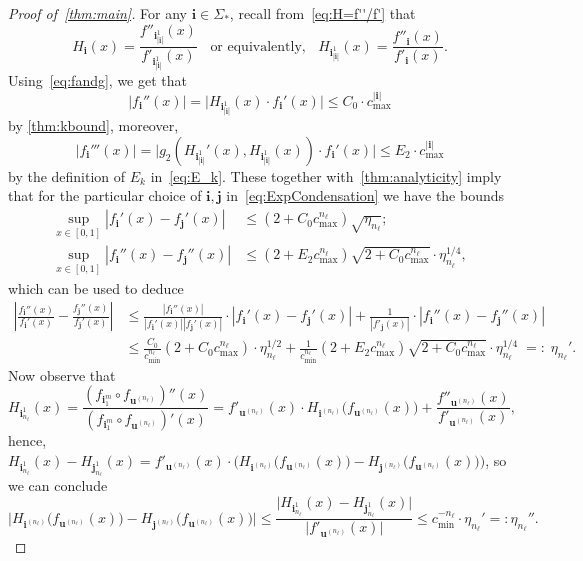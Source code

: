 \documentclass[12pt,]{article}
\theoremstyle{definition}
\theoremstyle{remark}
\newcommand{\0}{\mathbf{0}}
\newcommand{\bi}{\mathbf{i}}
\newcommand{\bj}{\mathbf{j}}
\newcommand{\bu}{\mathbf{u}}
\begin{document}
{\begin{proof}[Proof of~\cref{thm:main}]
For any $\bi\in\Sigma_*$, recall from~\cref{eq:H=f''/f'} that
\begin{equation*}
	H_{\bi}(x)= \frac{f''_{\bi_{|\bi|}^1}(x)}{f'_{\bi_{|\bi|}^1}(x)} \;\;\text{ or equivalently, }\;\; H_{\bi_{|\bi|}^1}(x) = \frac{f''_{\bi}(x)}{f'_{\bi}(x)}.
\end{equation*}
Using~\eqref{eq:fandg}, we get that
\begin{equation*}
 |f_{\bi}''(x)| = \big|H_{\bi_{|\bi|}^1}(x)\cdot f_{\bi}'(x)\big|\leq C_0 \cdot c_{\max}^{|\bi|}
\end{equation*}
by \cref{thm:kbound}, moreover,
\begin{equation*}
  |f_{\bi}'''(x)| = \big|g_2(H_{\bi_{|\bi|}^1}'(x),H_{\bi_{|\bi|}^1}(x))\cdot f_{\bi}'(x)\big| \leq E_2\cdot c_{\max}^{|\bi|}
\end{equation*}
by the definition of $E_k$ in~\cref{eq:E_k}. These together with~\cref{thm:analyticity} imply that for the particular choice of $\bi,\bj$ in~\cref{eq:ExpCondensation} we have the bounds
\begin{align*}
 \sup_{x\in[0,1]}|f_{\bi}'(x) - f_{\bj}'(x)| &\leq (2+C_0 c_{\max}^{n_\ell})\sqrt{\eta_{n_\ell}}; \\
 \sup_{x\in[0,1]}|f_{\bi}''(x) - f_{\bj}''(x)| &\leq (2+E_2c_{\max}^{n_\ell})\sqrt{2+C_0
 	c_{\max}^{n_\ell}}\cdot
 \eta_{n_\ell}^{1/4},
\end{align*}
which can be used to deduce
\begin{align*}
	\left|\frac{f_{\bi}''(x)}{f_{\bi}'(x)} - \frac{f_{\bj}''(x)}{f_{\bj}'(x)}\right|
	&\leq
	\frac{|f_{\bi}''(x)|}{|f_{\bi}'(x)||f_{\bj}'(x)|}\cdot|f_{\bi}'(x) - f_{\bj}'(x)|
	+\frac{1}{|f'_{\bj}(x)|} \cdot |f_{\bi}''(x) - f_{\bj}''(x)|
	\\
	&
	\leq \frac{C_0}{c_{\min}^{n_\ell}}(2+C_0c_{\max}^{n_\ell})\cdot \eta_{n_\ell}^{1/2}
	+\frac{1}{c_{\min}^{n_\ell}}(2+E_2
	c_{\max}^{n_\ell})\sqrt{2+C_0 c_{\max}^{n_\ell}} \cdot \eta_{n_\ell}^{1/4} \;=:\;\eta_{n_\ell}'.
\end{align*}
Now observe that
\begin{equation*}
H_{\bi_{n_{\ell}}^1}(x) = \frac{(f_{\bi_1^m}\circ f_{\bu^{(n_{\ell})}})''(x)}{(f_{\bi_1^m}\circ f_{\bu^{(n_{\ell})}})'(x)} = 
f'_{\bu^{(n_{\ell})}}(x) \cdot H_{\bi^{(n_{\ell})}} \big(f_{\bu^{(n_{\ell})}}(x)\big) + \frac{ f''_{\bu^{(n_{\ell})}}(x) }{ f'_{\bu^{(n_{\ell})}}(x)},
\end{equation*}
hence, $H_{\bi_{n_{\ell}}^1}(x)-H_{\bj_{n_{\ell}}^1}(x) = f'_{\bu^{(n_{\ell})}}(x) \cdot \big( H_{\bi^{(n_{\ell})}} \big(f_{\bu^{(n_{\ell})}}(x)\big) -H_{\bj^{(n_{\ell})}} \big(f_{\bu^{(n_{\ell})}}(x)\big) \big)$, so we can conclude
\[
\big| H_{\bi^{(n_{\ell})}} \big(f_{\bu^{(n_{\ell})}}(x)\big) -H_{\bj^{(n_{\ell})}} \big(f_{\bu^{(n_{\ell})}}(x)\big) \big|
 \leq \frac{\big|H_{\bi_{n_{\ell}}^1}(x)-H_{\bj_{n_{\ell}}^1}(x)\big|}{\big|f'_{\bu^{(n_{\ell})}}(x)\big|} \leq c_{\min}^{-{n_\ell}}
\cdot \eta_{n_\ell}'
=:\eta_{n_\ell}''.
\]


\end{proof}}
\end{document}
